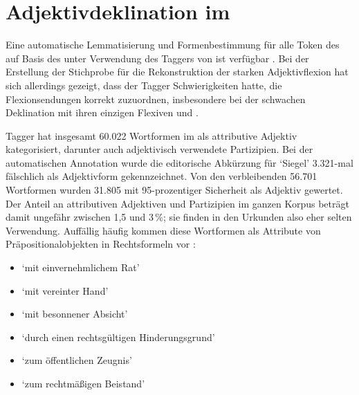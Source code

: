 \section[Adjektivdeklination im \tit{Corpus der altdeutschen Originalurkunden}]{Adjektivdeklination im \CAO{}}
\label{sec:adjdeclcao}

\label{phsec:formelhaftigkeit}
Eine automatische Lemmatisierung und Formenbestimmung für alle Token des
\CAO{} auf Basis des \REM{} unter Verwendung des Taggers von
\citet{schmid2019} ist verfügbar
\autocites[vgl.][207]{beckerschallert2021}[155--158]{beckerschallert2022b}. Bei
der Erstellung der Stichprobe für die Rekonstruktion der starken
Adjektivflexion hat sich allerdings gezeigt, dass der Tagger Schwierigkeiten
hatte, die Flexionsendungen korrekt zuzuordnen, insbesondere bei der schwachen
Deklination mit ihren einzigen Flexiven  und .

 Tagger hat insgesamt 60.022 Wortformen im \CAO{}
als attributive Adjektiv kategorisiert, darunter auch adjektivisch verwendete
Partizipien. Bei der automatischen Annotation wurde die editorische Abkürzung
 für `Siegel' 3.321-mal fälschlich als Adjektivform gekennzeichnet.
Von den verbleibenden 56.701 Wortformen wurden 31.805 mit 95-prozentiger
Sicherheit als Adjektiv gewertet. Der Anteil an attributiven Adjektiven und
Partizipien im ganzen Korpus beträgt damit ungefähr zwischen 1,5 und 3\,\%;
sie finden in den Urkunden also eher selten Verwendung. Auffällig häufig kommen
diese Wortformen als Attribute von Präpositionalobjekten in Rechtsformeln vor
\autocites[vgl.][30]{becker2016}:%

\begin{itemize}
	\item %
		`mit einvernehmlichem Rat'
	\item {}
		`mit vereinter Hand'
	\item %
		`mit besonnener Absicht'
	\item %
		`durch einen rechtsgültigen Hinderungsgrund'
	\item %
		`zum öffentlichen Zeugnis'
	\item %
		`zum rechtmäßigen Beistand'
\end{itemize}

